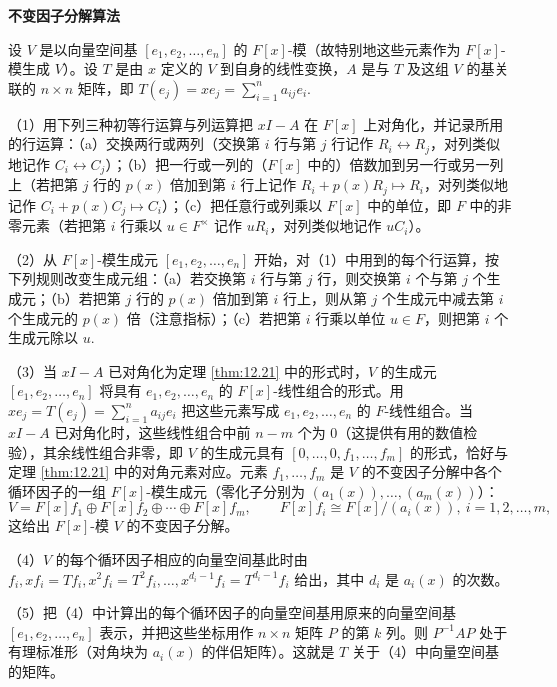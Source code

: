 \noindent\textbf{不变因子分解算法}

设 \(V\) 是以向量空间基 \([e_1, e_2, \ldots, e_n]\) 的 \(F[x]\)-模（故特别地这些元素作为 \(F[x]\)-模生成 \(V\)）。设 \(T\) 是由 \(x\) 定义的 \(V\) 到自身的线性变换，\(A\) 是与 \(T\) 及这组 \(V\) 的基关联的 \(n \times n\) 矩阵，即 \(T(e_j) = xe_j = \sum_{i=1}^n a_{ij}e_i\).

（1）用下列三种初等行运算与列运算把 \(xI-A\) 在 \(F[x]\) 上对角化，并记录所用的行运算：（a）交换两行或两列（交换第 \(i\) 行与第 \(j\) 行记作 \(R_i \leftrightarrow R_j\)，对列类似地记作 \(C_i \leftrightarrow C_j\)）；（b）把一行或一列的（\(F[x]\) 中的）倍数加到另一行或另一列上（若把第 \(j\) 行的 \(p(x)\) 倍加到第 \(i\) 行上记作 \(R_i+p(x)R_j \mapsto R_i\)，对列类似地记作 \(C_i+p(x)C_j \mapsto C_i\)）；（c）把任意行或列乘以 \(F[x]\) 中的单位，即 \(F\) 中的非零元素（若把第 \(i\) 行乘以 \(u \in F^\times\) 记作 \(uR_i\)，对列类似地记作 \(uC_i\)）。

（2）从 \(F[x]\)-模生成元 \([e_1, e_2, \ldots, e_n]\) 开始，对（1）中用到的每个行运算，按下列规则改变生成元组：（a）若交换第 \(i\) 行与第 \(j\) 行，则交换第 \(i\) 个与第 \(j\) 个生成元；（b）若把第 \(j\) 行的 \(p(x)\) 倍加到第 \(i\) 行上，则从第 \(j\) 个生成元中减去第 \(i\) 个生成元的 \(p(x)\) 倍（注意指标）；（c）若把第 \(i\) 行乘以单位 \(u \in F\)，则把第 \(i\) 个生成元除以 \(u\).

（3）当 \(xI-A\) 已对角化为定理 \ref{thm:12.21} 中的形式时，\(V\) 的生成元 \([e_1, e_2, \ldots, e_n]\) 将具有 \(e_1, e_2, \ldots, e_n\) 的 \(F[x]\)-线性组合的形式。用 \(xe_j = T(e_j) = \sum_{i=1}^n a_{ij}e_i\) 把这些元素写成 \(e_1, e_2, \ldots, e_n\) 的 \(F\)-线性组合。当 \(xI-A\) 已对角化时，这些线性组合中前 \(n-m\) 个为 0（这提供有用的数值检验），其余线性组合非零，即 \(V\) 的生成元具有 \([0, \ldots, 0, f_1, \ldots, f_m]\) 的形式，恰好与定理 \ref{thm:12.21} 中的对角元素对应。元素 \(f_1, \ldots, f_m\) 是 \(V\) 的不变因子分解中各个循环因子的一组 \(F[x]\)-模生成元（零化子分别为 \((a_1(x)), \ldots, (a_m(x))\)）：
\[
V = F[x]f_1 \oplus F[x]f_2 \oplus \cdots \oplus F[x]f_m, \qquad F[x]f_i \cong F[x]/(a_i(x)),\ i = 1, 2, \ldots, m,
\]
这给出 \(F[x]\)-模 \(V\) 的不变因子分解。

（4）\(V\) 的每个循环因子相应的向量空间基此时由 \(f_i, xf_i = Tf_i, x^2f_i = T^2f_i, \ldots, x^{d_i-1}f_i = T^{d_i-1}f_i\) 给出，其中 \(d_i\) 是 \(a_i(x)\) 的次数。

（5）把（4）中计算出的每个循环因子的向量空间基用原来的向量空间基 \([e_1, e_2, \ldots, e_n]\) 表示，并把这些坐标用作 \(n \times n\) 矩阵 \(P\) 的第 \(k\) 列。则 \(P^{-1}AP\) 处于有理标准形（对角块为 \(a_i(x)\) 的伴侣矩阵）。这就是 \(T\) 关于（4）中向量空间基的矩阵。

